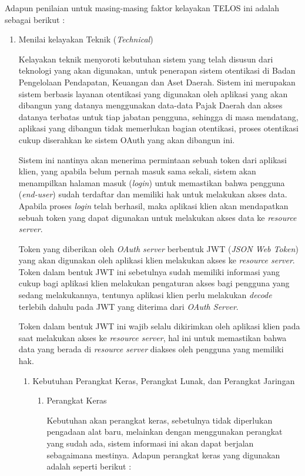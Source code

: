 \documentclass[pdftex,12pt, oneside]{article}
\begin{document}
Adapun penilaian untuk masing-masing faktor kelayakan TELOS ini adalah sebagai berikut :

\begin{enumerate}
	\item Menilai kelayakan Teknik (\textit{Technical})

Kelayakan teknik menyoroti kebutuhan sistem yang telah disusun dari teknologi yang akan digunakan, untuk penerapan sistem otentikasi di Badan Pengelolaan Pendapatan, Keuangan dan Aset Daerah. Sistem ini merupakan sistem berbasis layanan otentikasi yang digunakan oleh aplikasi yang akan dibangun yang datanya menggunakan data-data Pajak Daerah dan akses datanya terbatas untuk tiap jabatan pengguna, sehingga di masa mendatang, aplikasi yang dibangun tidak memerlukan bagian otentikasi, proses otentikasi cukup diserahkan ke sistem OAuth yang akan dibangun ini.

Sistem ini nantinya akan menerima permintaan sebuah token dari aplikasi klien, yang apabila belum pernah masuk sama sekali, sistem akan menampilkan halaman masuk (\textit{login}) untuk memastikan bahwa pengguna (\textit{end-user}) sudah terdaftar dan memiliki hak untuk melakukan akses data. Apabila proses \textit{login} telah berhasil, maka aplikasi klien akan mendapatkan sebuah token yang dapat digunakan untuk melakukan akses data ke \textit{resource server}.

Token yang diberikan oleh \textit{OAuth server} berbentuk JWT (\textit{JSON Web Token}) yang akan digunakan oleh aplikasi klien melakukan akses ke \textit{resource server}. Token dalam bentuk JWT ini sebetulnya sudah memiliki informasi yang cukup bagi aplikasi klien melakukan pengaturan akses bagi pengguna yang sedang melakukannya, tentunya aplikasi klien perlu melakukan \textit{decode} terlebih dahulu pada JWT yang diterima dari \textit{OAuth Server}.

Token dalam bentuk JWT ini wajib selalu dikirimkan oleh aplikasi klien pada saat melakukan akses ke \textit{resource server}, hal ini untuk memastikan bahwa data yang berada di \textit{resource server} diakses oleh pengguna yang memiliki hak.

\begin{enumerate}
	\item Kebutuhan Perangkat Keras, Perangkat Lunak, dan Perangkat Jaringan
	
\begin{enumerate}
	\item Perangkat Keras
	
Kebutuhan akan perangkat keras, sebetulnya tidak diperlukan pengadaan alat baru, melainkan dengan menggunakan perangkat yang sudah ada, sistem informasi ini akan dapat berjalan sebagaimana mestinya. Adapun perangkat keras yang digunakan adalah seperti berikut :


\end{enumerate}
\end{enumerate}
\end{enumerate}
\end{document}
